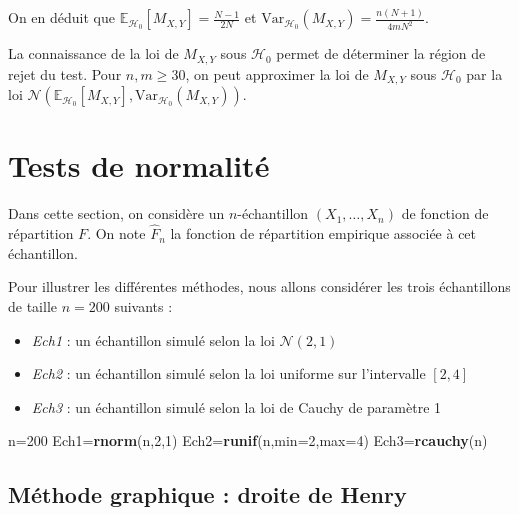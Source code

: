 \documentclass[
]{book}
\newenvironment{Shaded}{\begin{snugshade}}{\end{snugshade}}
\newcommand{\DataTypeTok}[1]{\textcolor[rgb]{0.13,0.29,0.53}{#1}}
\newcommand{\DecValTok}[1]{\textcolor[rgb]{0.00,0.00,0.81}{#1}}
\newcommand{\KeywordTok}[1]{\textcolor[rgb]{0.13,0.29,0.53}{\textbf{#1}}}
\newcommand{\NormalTok}[1]{#1}
\providecommand{\tightlist}{%
  \setlength{\itemsep}{0pt}\setlength{\parskip}{0pt}}
\theoremstyle{definition}
\theoremstyle{definition}
\theoremstyle{definition}
\theoremstyle{definition}
\theoremstyle{remark}
\begin{document}
On en déduit que \(\mathbb{E}_{\mathcal{H}_0}[M_{X,Y}] = \frac{N-1}{2N}\) et \(\mbox{Var}_{\mathcal{H}_0}(M_{X,Y}) = \frac{n(N+1)}{4mN^2}\).

La connaissance de la loi de \(M_{X,Y}\) sous \(\mathcal{H}_0\) permet de déterminer la région de rejet du test. Pour \(n,m \geq 30\), on peut approximer la loi de \(M_{X,Y}\) sous \(\mathcal{H}_0\) par la loi \(\mathcal{N}(\mathbb{E}_{\mathcal{H}_0}[M_{X,Y}],\mbox{Var}_{\mathcal{H}_0}(M_{X,Y}))\).

\hypertarget{tests-de-normalituxe9}{%
\section{Tests de normalité}\label{tests-de-normalituxe9}}

Dans cette section, on considère un \(n\)-échantillon \((X_1,\ldots,X_n)\) de fonction de répartition \(F\). On note \(\hat F_n\) la fonction de répartition empirique associée à cet échantillon.

Pour illustrer les différentes méthodes, nous allons considérer les trois échantillons de taille \(n=200\) suivants :

\begin{itemize}
\tightlist
\item
  \emph{Ech1} : un échantillon simulé selon la loi \(\mathcal N(2,1)\)
\item
  \emph{Ech2} : un échantillon simulé selon la loi uniforme sur l'intervalle \([2,4]\)
\item
  \emph{Ech3} : un échantillon simulé selon la loi de Cauchy de paramètre 1
\end{itemize}

\begin{Shaded}
\begin{Highlighting}[]
\NormalTok{n=}\DecValTok{200}
\NormalTok{Ech1=}\KeywordTok{rnorm}\NormalTok{(n,}\DecValTok{2}\NormalTok{,}\DecValTok{1}\NormalTok{)}
\NormalTok{Ech2=}\KeywordTok{runif}\NormalTok{(n,}\DataTypeTok{min=}\DecValTok{2}\NormalTok{,}\DataTypeTok{max=}\DecValTok{4}\NormalTok{)}
\NormalTok{Ech3=}\KeywordTok{rcauchy}\NormalTok{(n)}
\end{Highlighting}
\end{Shaded}

\hypertarget{muxe9thode-graphique-droite-de-henry}{%
\subsection{Méthode graphique : droite de Henry}\label{muxe9thode-graphique-droite-de-henry}}
\end{document}
